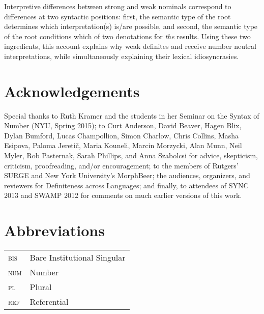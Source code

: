\documentclass[output=paper,
modfonts
]{langscibook}
\begin{document}
Interpretive differences between strong and weak nominals correspond to differences at two syntactic positions: first, the semantic type of the root determines which interpretation(s) is/are possible, and second, the semantic type of the root conditions which of two denotations for \textit{the} results. Using these two ingredients, this account explains why weak definites and  receive number neutral interpretations, while simultaneously explaining their lexical idio\-syncrasies.

\section*{Acknowledgements}
Special thanks to Ruth Kramer and the students in her Seminar on the Syntax of Number (NYU, Spring 2015); to Curt Anderson, David Beaver, Hagen Blix, Dylan Bumford, Lucas Champollion, Simon Charlow,  Chris Collins, Masha Esipova, Paloma Jereti{\v c}, Maria Kouneli, Marcin Morzycki, Alan Munn, Neil Myler, Rob Pasternak, Sarah Phillips, and Anna Szabolcsi for advice, skepticism, criticism, proofreading, and/or encouragement; to the members of Rutgers' SURGE and New York University's MorphBeer; the audiences, organizers, and reviewers for Definiteness across Languages; and finally, to attendees of SYNC 2013 and SWAMP 2012 for comments on much earlier versions of this work. 

\section*{Abbreviations}
\begin{tabular}{ll}
	\textsc{bis} & Bare Institutional Singular \\
	\textsc{num} & Number \\
	\textsc{pl} & Plural \\
	\textsc{ref} & Referential \\
\end{tabular}

{\sloppy
\printbibliography[heading=subbibliography,notkeyword=this]
}
\end{document}
